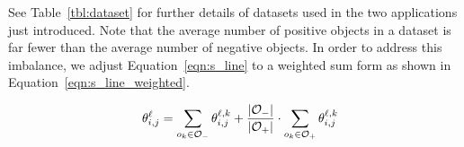 See Table~\ref{tbl:dataset} for further details of datasets used in the two applications just introduced. Note that the average number of positive objects in a dataset is far fewer than the average number of negative objects. In order to address this imbalance, we adjust Equation~\ref{eqn:s_line} to a weighted sum form as shown in Equation~\ref{eqn:s_line_weighted}.





\begin{equation}\label{eqn:s_line_weighted}
\hspace{3mm} \theta_{i,j}^{\ell}= \sum_{o_k\in{\oo_-}}{\theta_{i,j}^{\ell,k}}+\frac{|\oo_-|}{|\oo_+|}\cdot\sum_{o_k\in{\oo_+}}{\theta_{i,j}^{\ell,k}} %
\end{equation}


